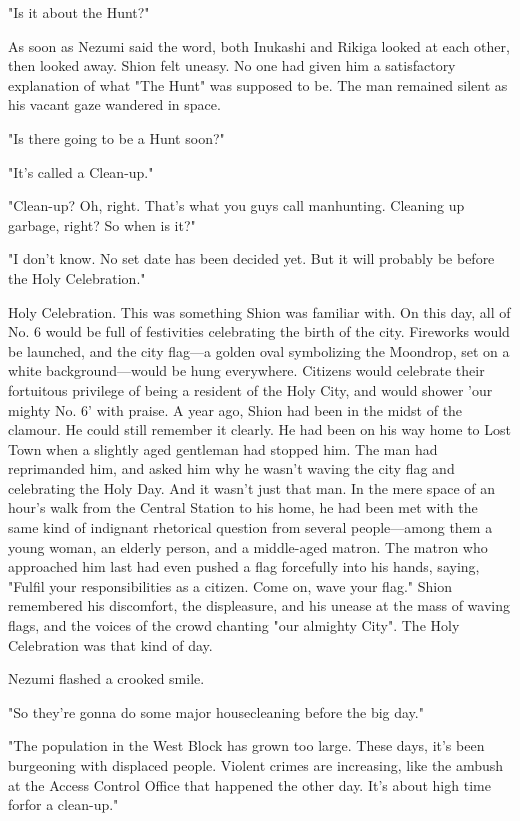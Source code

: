 "Is it about the Hunt?"

As soon as Nezumi said the word, both Inukashi and Rikiga looked at each
other, then looked away. Shion felt uneasy. No one had given him a
satisfactory explanation of what "The Hunt" was supposed to be. The man
remained silent as his vacant gaze wandered in space.

"Is there going to be a Hunt soon?"

"It's called a Clean-up."

"Clean-up? Oh, right. That's what you guys call manhunting. Cleaning up
garbage, right? So when is it?"

"I don't know. No set date has been decided yet. But it will probably be
before the Holy Celebration."

Holy Celebration. This was something Shion was familiar with. On this
day, all of No. 6 would be full of festivities celebrating the birth of
the city. Fireworks would be launched, and the city flag---a golden oval
symbolizing the Moondrop, set on a white background---would be hung
everywhere. Citizens would celebrate their fortuitous privilege of being
a resident of the Holy City, and would shower 'our mighty No. 6' with
praise. A year ago, Shion had been in the midst of the clamour. He could
still remember it clearly. He had been on his way home to Lost Town when
a slightly aged gentleman had stopped him. The man had reprimanded him,
and asked him why he wasn't waving the city flag and celebrating the
Holy Day. And it wasn't just that man. In the mere space of an hour's
walk from the Central Station to his home, he had been met with the same
kind of indignant rhetorical question from several people---among them a
young woman, an elderly person, and a middle-aged matron. The matron who
approached him last had even pushed a flag forcefully into his hands,
saying, "Fulfil your responsibilities as a citizen. Come on, wave your
flag." Shion remembered his discomfort, the displeasure, and his unease
at the mass of waving flags, and the voices of the crowd chanting "our
almighty City". The Holy Celebration was that kind of day.

Nezumi flashed a crooked smile.

"So they're gonna do some major housecleaning before the big day."

"The population in the West Block has grown too large. These days, it's
been burgeoning with displaced people. Violent crimes are increasing,
like the ambush at the Access Control Office that happened the other
day. It's about high time for\el for a clean-up."

